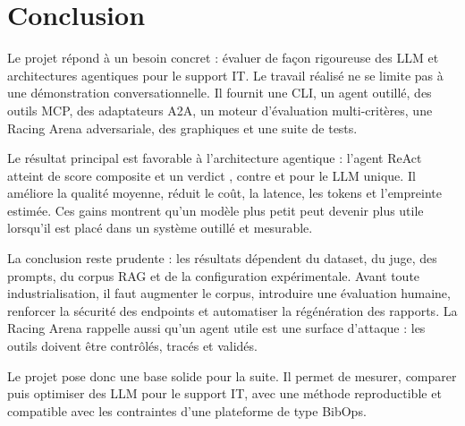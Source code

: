
\chapter{Conclusion}

Le projet \bibopsname{} répond à un besoin concret : évaluer de façon rigoureuse
des LLM et architectures agentiques pour le support IT. Le travail réalisé ne se
limite pas à une démonstration conversationnelle. Il fournit une CLI, un agent
outillé, des outils MCP, des adaptateurs A2A, un moteur d'évaluation
multi-critères, une Racing Arena adversariale, des graphiques et une suite de
tests.

Le résultat principal est favorable à l'architecture agentique : l'agent ReAct atteint  de score composite et
un verdict , contre  et  pour le
LLM unique. Il améliore la qualité moyenne, réduit le coût, la latence, les
tokens et l'empreinte estimée. Ces gains montrent qu'un modèle plus petit peut
devenir plus utile lorsqu'il est placé dans un système outillé et mesurable.

La conclusion reste prudente : les résultats dépendent du dataset, du juge, des
prompts, du corpus RAG et de la configuration expérimentale. Avant toute
industrialisation, il faut augmenter le corpus, introduire une évaluation
humaine, renforcer la sécurité des endpoints et automatiser la régénération des
rapports. La Racing Arena rappelle aussi qu'un agent utile est une surface
d'attaque : les outils doivent être contrôlés, tracés et validés.

Le projet pose donc une base solide pour la suite. Il permet de mesurer,
comparer puis optimiser des LLM pour le support IT, avec une méthode
reproductible et compatible avec les contraintes d'une plateforme de type
BibOps.
